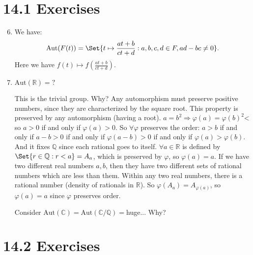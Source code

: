 \documentclass[9pt,reqno,twoside]{amsbook}
\theoremstyle{plain}
\numberwithin{section}{chapter}
\numberwithin{equation}{chapter}
\theoremstyle{definition}
\theoremstyle{remark}
\theoremstyle{plain}
\newcommand{\R}{\mathbb{R}}
\newcommand{\Q}{\mathbb{Q}}
\renewcommand{\c}{\mathbb{C}}
\newcommand{\bee}{\begin{equation}\begin{aligned}}
\newcommand{\eee}{\end{aligned}\end{equation}}
\newcommand{\fracc}{\frac}
\newcommand{\lpar}{\left(}
\newcommand{\rpar}{\right)}
\newcommand{\counter}{\setcounter}
\newcommand{\aut}{\mathrm{Aut}}
\renewcommand{\phi}{\varphi}
\begin{document}
\section*{14.1 Exercises}

\begin{enumerate}[label=\arabic*.]
\counter{enumi}{5}
\item 

We have:
\bee
\aut(F(t)) = \Set{t \mapsto \fracc{at + b}{ct + d}: a,b,c,d \in F, ad - bc \neq 0}.
\eee
Here we have $f(t) \mapsto f\lpar \fracc{at + b}{ct + d} \rpar$. 

\item \textit{$\aut(\R) = ?$}

This is the trivial group. Why? Any automorphism must preserve positive numbers, since they are characterized by the square root. This property is preserved by any automorphism (having a root). $a = b^2 \Rightarrow \phi(a) = \phi(b)^2$< so $a > 0$ if and only if $\phi(a) > 0$. So $\forall \phi$ preserves the order: $a > b$ if and only if $a - b > 0$ if and only if $\phi(a - b) > 0$ if and only if $\phi(a) > \phi(b)$. And it fixes $\Q$ since each rational goes to itself. $\forall a \in \R$ is defined by $\Set{r \in \Q: r < a} = A_a$, which is preserved by $\phi$, so $\phi(a) = a$. If we have two different real numbers $a,b$, then they have two different sets of rational numbers which are less than them. Within any two real numbers, there is a rational number (density of rationals in $\R$). So $\phi(A_a) = A_{\phi(a)}$, so $\phi(a) = a$ since $\phi$ preserves order. 


Consider $\aut(\c) = \aut(\c/\Q) = $huge... Why? 
\begin{center}
\end{center}

\end{enumerate}


\section*{14.2 Exercises}
\end{document}

